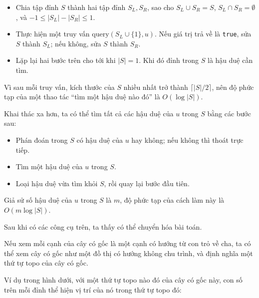 \documentclass[11pt]{article}
\begin{document}
\begin{itemize}
  \item Chia tập đỉnh \(S\) thành hai tập đỉnh \(S_L,S_R\), sao cho
  \(S_L\cup S_R=S\), \(S_L\cap S_R=\emptyset\), và
  \(-1\le |S_L|-|S_R|\le 1\).
  \item Thực hiện một truy vấn \(\mathrm{query}(S_L\cup\{1\},u)\). Nếu giá trị
  trả về là \texttt{true}, sửa \(S\) thành \(S_L\); nếu không, sửa \(S\) thành
  \(S_R\).
  \item Lặp lại hai bước trên cho tới khi \(|S|=1\). Khi đó đỉnh trong \(S\) là
  hậu duệ cần tìm.
\end{itemize}

Vì sau mỗi truy vấn, kích thước của \(S\) nhiều nhất trở thành
\(\lceil |S|/2\rceil\), nên độ phức tạp của một thao tác ``tìm một hậu duệ nào
đó'' là \(O(\log |S|)\).

Khai thác xa hơn, ta có thể tìm tất cả các hậu duệ của \(u\) trong \(S\) bằng
các bước sau:

\begin{itemize}
  \item Phán đoán trong \(S\) có hậu duệ của \(u\) hay không; nếu không thì
  thoát trực tiếp.
  \item Tìm một hậu duệ của \(u\) trong \(S\).
  \item Loại hậu duệ vừa tìm khỏi \(S\), rồi quay lại bước đầu tiên.
\end{itemize}

Giả sử số hậu duệ của \(u\) trong \(S\) là \(m\), độ phức tạp của cách làm này
là \(O(m\log |S|)\).

Sau khi có các công cụ trên, ta thấy có thể chuyển hóa bài toán.

Nếu xem mỗi cạnh của cây có gốc là một cạnh có hướng từ con trỏ về cha, ta có
thể xem cây có gốc như một đồ thị có hướng không chu trình, và định nghĩa một
thứ tự topo của cây có gốc.

Ví dụ trong hình dưới, với một thứ tự topo nào đó của cây có gốc này, con số
trên mỗi đỉnh thể hiện vị trí của nó trong thứ tự topo đó:

\begin{center}
\end{center}
\end{document}
